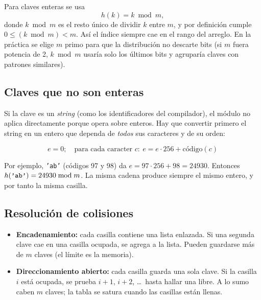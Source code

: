\documentclass[10pt,a4paper]{article}
\theoremstyle{definition}
\begin{document}
Para claves enteras se usa
\[
    h(k) = k \bmod m,
\]
donde $k \bmod m$ es el resto único de dividir $k$ entre $m$, y por
definición cumple $0 \le (k \bmod m) < m$. Así el índice siempre
cae en el rango del arreglo. En la práctica se elige $m$ primo para
que la distribución no descarte bits (si $m$ fuera potencia de 2, $k \bmod m$
usaría solo los últimos bits y agruparía claves con patrones similares).

\subsection{Claves que no son enteras}

Si la clave es un \emph{string} (como los identificadores del compilador),
el módulo no aplica directamente porque opera sobre enteros. Hay que convertir primero
el string en un entero que dependa de \emph{todos} sus caracteres y de su orden:

\[
    e = 0;\quad \text{para cada caracter } c:\ e = e \cdot 256 + \text{código}(c)
\]

Por ejemplo, \texttt{'ab'} (códigos 97 y 98) da $e = 97\cdot 256 + 98 = 24930$. Entonces
$h(\text{\ttfamily 'ab'} ) = 24930 \bmod m$. La misma cadena produce
siempre el mismo entero, y por tanto la misma casilla.

\subsection{Resolución de colisiones}

\begin{itemize}
    \item \textbf{Encadenamiento:} cada casilla contiene una lista enlazada. Si 
        una segunda clave cae en una casilla ocupada, se agrega
        a la lista. Pueden guardarse más de $m$ claves (el límite es la memoria).
    \item \textbf{Direccionamiento abierto:} cada casilla guarda una sola
        clave. Si la casilla $i$ está ocupada, se prueba $i+1$,
        $i+2$, \dots\ hasta hallar una libre. A lo sumo caben
        $m$ claves; la tabla se satura cuando las casillas están llenas.
\end{itemize}
\end{document}
